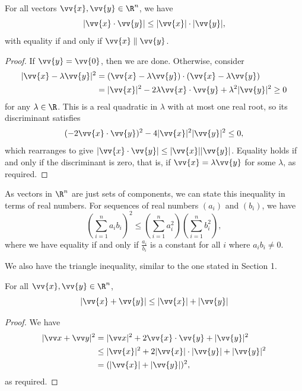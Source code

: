 \begin{proposition}
    For all vectors $\vv{x}, \vv{y} \in \R^n$, we have
    $$
|\vv{x} \cdot \vv{y}| \leq |\vv{x} | \cdot |\vv{y}|,
    $$
    with equality if and only if $\vv{x} \parallel \vv{y}$.
\end{proposition}
\begin{proof}
    If $\vv{y} = \vv{0}$, then we are done. Otherwise, consider
    \begin{align*}
        |\vv{x} - \lambda \vv{y}|^2 &= (\vv{x} - \lambda\vv{y}) \cdot (\vv{x} - \lambda \vv{y}) \\
        &= |\vv{x}|^2 - 2 \lambda \vv{x} \cdot \vv{y} + \lambda^2 |\vv{y}|^2 \geq 0
    \end{align*}
    for any $\lambda \in \R$. This is a real quadratic in $\lambda$ with at most one real root, so its discriminant satisfies
    $$
    (-2 \vv{x} \cdot \vv{y})
^2 - 4|\vv{x}|^2 |\vv{y}|^2 \leq 0,    $$
which rearranges to give $|\vv{x} \cdot \vv{y}| \leq |\vv{x}||\vv{y}|$. Equality holds if and only if the discriminant is zero, that is, if $\vv{x} = \lambda \vv{y}$ for some $\lambda$, as required.
\end{proof}

As vectors in $\R^n$ are just sets of components, we can state this inequality in terms of real numbers.
    For sequences of real numbers $(a_i)$ and $(b_i)$, we have
    $$
\left(\sum_{i = 1}^n a_i b_i\right)^2 \leq \left(\sum_{i = 1}^n a_i^2 \right)\left(\sum_{i = 1}^n b_i^2 \right),
    $$
    where we have equality if and only if $\frac{a_i}{b_i}$ is a constant for all $i$ where $a_i b_i \neq 0$.

We also have the triangle inequality, similar to the one stated in Section 1.

\begin{proposition}
    For all $\vv{x},\vv{y} \in \R^n$,
    $$
    |\vv{x} + \vv{y} |\leq |\vv{x}| + |\vv{y}|
    $$
\end{proposition}
\begin{proof}
We have
\begin{align*}
    |\vv x + \vv y|^2 &= |\vv x|^2 + 2 \vv{x}\cdot \vv{y} + |\vv{y}|^2 \\
    &\leq |\vv{x}|^2 + 2 |\vv{x}| \cdot |\vv{y}| + |\vv{y}|^2 \\
    &= (|\vv{x}| + |\vv{y}|)^2,
\end{align*}
as required.
\end{proof}

